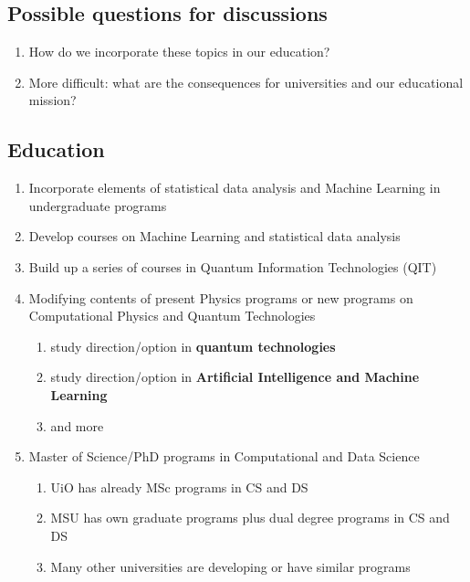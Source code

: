 \documentclass[%
oneside,                 %
final,                   %
10pt]{article}
\begin{document}
\subsection{Possible questions for discussions}

\begin{enumerate}
\item How do we incorporate these topics in our education?

\item More difficult: what are the consequences for universities and our educational mission?
\end{enumerate}

\noindent
\subsection{Education}

\begin{enumerate}
\item Incorporate elements of statistical data analysis and Machine Learning in undergraduate programs

\item Develop courses on Machine Learning and statistical data analysis

\item Build up a series of courses in Quantum Information Technologies (QIT)

\item Modifying contents of present Physics programs or new programs on  Computational Physics and Quantum Technologies
\begin{enumerate}

 \item study direction/option in \textbf{quantum technologies}

 \item study direction/option in \textbf{Artificial Intelligence and Machine Learning}

 \item and more

\end{enumerate}

\noindent
\item Master of Science/PhD programs in Computational and Data Science
\begin{enumerate}

 \item UiO has already MSc programs in CS and DS

 \item MSU has own graduate programs plus dual degree programs in CS and DS

 \item Many other universities are developing or have similar programs
\end{enumerate}

\noindent
\end{enumerate}
\end{document}

